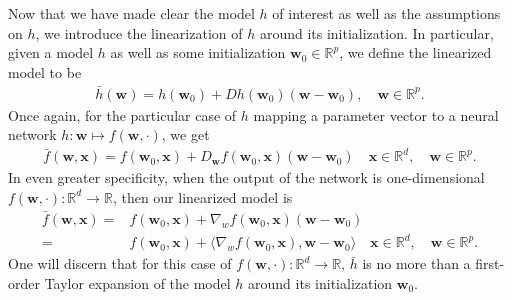 \documentclass{article}
\begin{document}
Now that we have made clear the model $h$ of interest as well as the assumptions on $h$, we introduce the linearization of $h$ around its initialization. In particular, given a model $h$ as well as some initialization $\boldsymbol{w}_0 \in \mathbb{R}^p$, we define the linearized model to be 
\begin{align}
\bar{h}(\boldsymbol{w}) = h(\boldsymbol{w}_0) + Dh(\boldsymbol{w}_0)(\boldsymbol{w} - \boldsymbol{w}_0), \quad \boldsymbol{w} \in \mathbb{R}^p\label{linearizedmodel}.
\end{align}
Once again, for the particular case of $h$ mapping a parameter vector to a neural network $h: \boldsymbol{w} \mapsto f(\boldsymbol{w}, \cdot)$, we get
\begin{align*}
    \bar{f}(\boldsymbol{w}, \boldsymbol{x}) = f(\boldsymbol{w}_0, \boldsymbol{x}) + D_{\boldsymbol{w}} f(\boldsymbol{w}_0, \boldsymbol{x})(\boldsymbol{w} - \boldsymbol{w}_0) \quad \boldsymbol{x} \in \mathbb{R}^d, \quad \boldsymbol{w} \in \mathbb{R}^p. 
\end{align*}
In even greater specificity, when the output of the network is one-dimensional $f(\boldsymbol{w}, \cdot): \mathbb{R}^d \rightarrow \mathbb{R}$, then our linearized model is
\begin{align}
    \bar{f}(\boldsymbol{w}, \boldsymbol{x}) =& f(\boldsymbol{w}_0, \boldsymbol{x}) + \nabla_w f(\boldsymbol{w}_0, \boldsymbol{x})(\boldsymbol{w} - \boldsymbol{w}_0) \nonumber\\
    =& f(\boldsymbol{w}_0, \boldsymbol{x}) + \langle \nabla_w f(\boldsymbol{w}_0, \boldsymbol{x}), \boldsymbol{w} - \boldsymbol{w}_0 \rangle \quad \boldsymbol{x} \in \mathbb{R}^d, \quad \boldsymbol{w} \in \mathbb{R}^p\label{linearizednetwork}.
\end{align}
One will discern that for this case of $f(\boldsymbol{w}, \cdot): \mathbb{R}^d \rightarrow \mathbb{R}$, $\bar{h}$ is no more than a first-order Taylor expansion of the model $h$ around its initialization $\boldsymbol{w}_0$.
\end{document}
